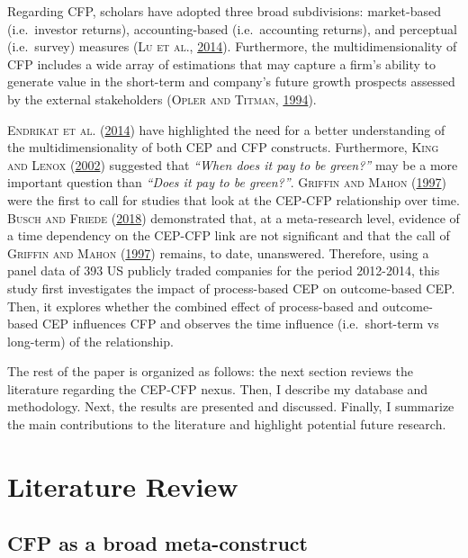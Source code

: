 \documentclass[12pt,]{article}
\begin{document}
Regarding CFP, scholars have adopted three broad subdivisions:
market-based (i.e.~investor returns), accounting-based (i.e.~accounting
returns), and perceptual (i.e.~survey) measures (\textsc{Lu et al.},
\protect\hyperlink{ref-Ludecadedebatenexus2014}{2014}). Furthermore, the
multidimensionality of CFP includes a wide array of estimations that may
capture a firm's ability to generate value in the short-term and
company's future growth prospects assessed by the external stakeholders
(\textsc{Opler and Titman}, \protect\hyperlink{ref-Opler1994}{1994}).

\textsc{Endrikat et al.}
(\protect\hyperlink{ref-EndrikatMakingsenseconflicting2014}{2014}) have
highlighted the need for a better understanding of the
multidimensionality of both CEP and CFP constructs. Furthermore,
\textsc{King and Lenox} (\protect\hyperlink{ref-King2002}{2002})
suggested that \emph{``When does it pay to be green?''} may be a more
important question than \emph{``Does it pay to be green?''}.
\textsc{Griffin and Mahon} (\protect\hyperlink{ref-Griffin1997}{1997})
were the first to call for studies that look at the CEP-CFP relationship
over time. \textsc{Busch and Friede}
(\protect\hyperlink{ref-Busch2018}{2018}) demonstrated that, at a
meta-research level, evidence of a time dependency on the CEP-CFP link
are not significant and that the call of \textsc{Griffin and Mahon}
(\protect\hyperlink{ref-Griffin1997}{1997}) remains, to date,
unanswered. Therefore, using a panel data of 393 US publicly traded
companies for the period 2012-2014, this study first investigates the
impact of process-based CEP on outcome-based CEP. Then, it explores
whether the combined effect of process-based and outcome-based CEP
influences CFP and observes the time influence (i.e.~short-term vs
long-term) of the relationship.

The rest of the paper is organized as follows: the next section reviews
the literature regarding the CEP-CFP nexus. Then, I describe my database
and methodology. Next, the results are presented and discussed. Finally,
I summarize the main contributions to the literature and highlight
potential future research.

\FloatBarrier
\newpage
{}

\section{Literature Review}\label{literature-review}

\subsection{CFP as a broad
meta-construct}\label{cfp-as-a-broad-meta-construct}
\end{document}
